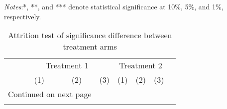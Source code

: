 \documentclass[10pt,a4paper]{article}
\begin{document}
\begin{center}
	{\tiny \tabcolsep=1pt  %
		\begin{ThreePartTable}
			\begin{TableNotes}[flushleft]
				\tiny
				\item \textit{Notes}:*, **, and *** denote statistical significance at 10\%, 5\%, and 1\%, respectively.
			\end{TableNotes}
			\begin{longtable}{l*{7}{c}}
				\caption{Attrition test of significance difference between treatment arms}\label{tab:attrition_cash}					\\
				\toprule
				\hline 
				\multicolumn{1}{c}{}&
				\multicolumn{3}{c}{Treatment 1}&
				\multicolumn{3}{c}{Treatment 2}& \\
				\cmidrule(r){2-4}\cmidrule(r){5-7}
				& {(1)} & {(2)} & {(3)} & {(1)} & {(2)} & {(3)} \\ 
				\hline 
				\endfirsthead
				\hline
				\endhead
				\hline
				\multicolumn{3}{r}{{Continued on next page}} \\
				\endfoot
				
				\bottomrule
				\insertTableNotes
				\endlastfoot
				
			\end{longtable}
		\end{ThreePartTable}
	}
\end{center}
\end{document}
